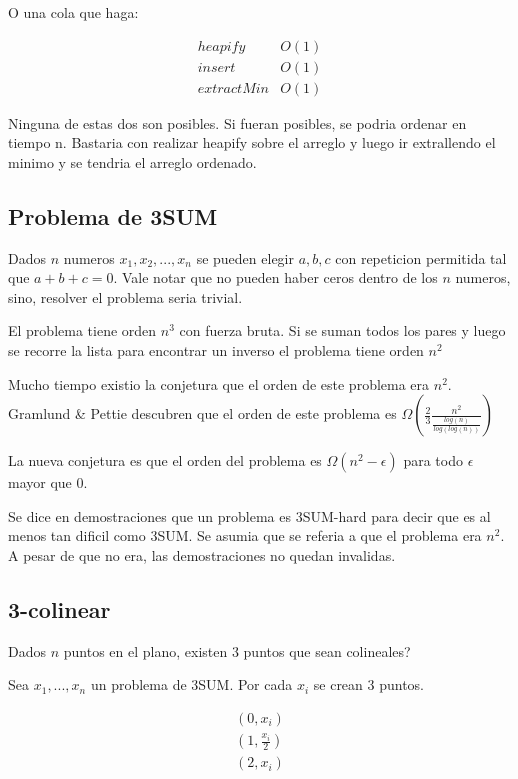 \documentclass[12pt]{article}
\begin{document}
O una cola que haga:

\begin{align}
heapify & O(1) \\
insert & O(1) \\
extractMin & O(1)
\end{align}

Ninguna de estas dos son posibles. Si fueran posibles, se podria ordenar en tiempo n. Bastaria con realizar heapify sobre el arreglo y luego ir extrallendo el minimo y se tendria el arreglo ordenado.

\subsection{Problema de 3SUM}

Dados $n$ numeros $x_1, x_2, ... , x_n$ se pueden elegir $a,b,c$ con repeticion permitida tal que $a + b + c = 0$. Vale notar que no pueden haber ceros dentro de los $n$ numeros, sino, resolver el problema seria trivial.

El problema tiene orden $n^3$ con fuerza bruta.
Si se suman todos los pares y luego se recorre la lista para encontrar un inverso el problema tiene orden $n^2$

Mucho tiempo existio la conjetura que el orden de este problema era $n^2$. Gramlund \& Pettie descubren que el orden de este problema es $\Omega(\frac{2}{3}\frac{n^2}{\frac{log(n)}{log(log(n))}})$

La nueva conjetura es que el orden del problema es $\Omega(n^2 - \epsilon)$ para todo $\epsilon$ mayor que $0$.

Se dice en demostraciones que un problema es 3SUM-hard para decir que es al menos tan dificil como 3SUM. Se asumia que se referia a que el problema era $n^2$. A pesar de que no era, las demostraciones no quedan invalidas.

\subsection{3-colinear}

Dados $n$ puntos en el plano, existen $3$ puntos que sean colineales?

Sea $x_1, ... , x_n$ un problema de 3SUM. Por cada $x_i$ se crean $3$ puntos.

\begin{align}
(0, x_i) \\
(1, \frac{x_i}{2}) \\
(2, x_i)
\end{align}
\end{document}
